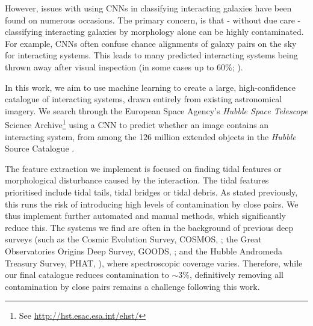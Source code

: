 However, issues with using CNNs in classifying interacting galaxies have been found on numerous occasions. The primary concern, is that - without due care - classifying interacting galaxies by morphology alone can be highly contaminated. For example, CNNs often confuse chance alignments of galaxy pairs on the sky for interacting systems. This leads to many predicted interacting systems being thrown away after visual inspection (in some cases up to 60\%; \citet{2019MNRAS.490.5390B, 2022A&A...661A..52P}). 

In this work, we aim to use machine learning to create a large, high-confidence catalogue of interacting systems, drawn entirely from existing astronomical imagery. We search through the European Space Agency's \emph{Hubble Space Telescope} Science Archive\footnote{See \url{http://hst.esac.esa.int/ehst/}} using a CNN to predict whether an image contains an interacting system, from among the 126 million extended objects in the \emph{Hubble} Source Catalogue \citep[HSC;][]{2016AJ....151..134W}. \DIFaddbegin {}

\DIFaddend The feature extraction we implement is focused on finding tidal features or morphological disturbance caused by the interaction. The tidal features prioritised include tidal tails, tidal bridges or tidal debris. As stated previously, this runs the risk of introducing high levels of contamination by close pairs. We thus implement further automated and manual methods, which significantly reduce this. The systems we find are often in the background of previous deep surveys (such as the Cosmic Evolution Survey, COSMOS, \citealt{2007ApJS..172....1S}; the Great Observatories Origins Deep Survey, GOODS, \citealt{2004ApJ...600L..93G}; and the \DIFdelbegin {}\DIFdelend \DIFaddbegin {}\DIFaddend Hubble Andromeda Treasury Survey, PHAT, \citealt{2012ApJS..200...18D}), where spectroscopic coverage varies. Therefore, while our final catalogue reduces contamination to $\sim 3\%$, definitively removing all contamination by close pairs remains a challenge following this work.

